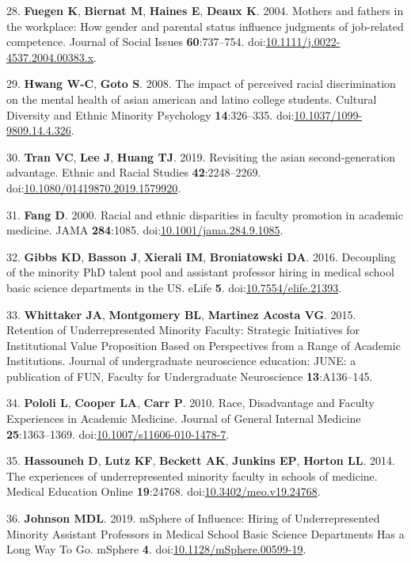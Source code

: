 \documentclass[10pt,]{article}
\begin{document}
\hypertarget{ref-Fuegen2004}{}
28. \textbf{Fuegen K}, \textbf{Biernat M}, \textbf{Haines E},
\textbf{Deaux K}. 2004. Mothers and fathers in the workplace: How gender
and parental status influence judgments of job-related competence.
Journal of Social Issues \textbf{60}:737--754.
doi:\href{https://doi.org/10.1111/j.0022-4537.2004.00383.x}{10.1111/j.0022-4537.2004.00383.x}.

\hypertarget{ref-Hwang2008}{}
29. \textbf{Hwang W-C}, \textbf{Goto S}. 2008. The impact of perceived
racial discrimination on the mental health of asian american and latino
college students. Cultural Diversity and Ethnic Minority Psychology
\textbf{14}:326--335.
doi:\href{https://doi.org/10.1037/1099-9809.14.4.326}{10.1037/1099-9809.14.4.326}.

\hypertarget{ref-Tran2019}{}
30. \textbf{Tran VC}, \textbf{Lee J}, \textbf{Huang TJ}. 2019.
Revisiting the asian second-generation advantage. Ethnic and Racial
Studies \textbf{42}:2248--2269.
doi:\href{https://doi.org/10.1080/01419870.2019.1579920}{10.1080/01419870.2019.1579920}.

\hypertarget{ref-Fang2000}{}
31. \textbf{Fang D}. 2000. Racial and ethnic disparities in faculty
promotion in academic medicine. JAMA \textbf{284}:1085.
doi:\href{https://doi.org/10.1001/jama.284.9.1085}{10.1001/jama.284.9.1085}.

\hypertarget{ref-Gibbs2016}{}
32. \textbf{Gibbs KD}, \textbf{Basson J}, \textbf{Xierali IM},
\textbf{Broniatowski DA}. 2016. Decoupling of the minority PhD talent
pool and assistant professor hiring in medical school basic science
departments in the US. eLife \textbf{5}.
doi:\href{https://doi.org/10.7554/elife.21393}{10.7554/elife.21393}.

\hypertarget{ref-whittaker_retention_2015}{}
33. \textbf{Whittaker JA}, \textbf{Montgomery BL}, \textbf{Martinez
Acosta VG}. 2015. Retention of Underrepresented Minority Faculty:
Strategic Initiatives for Institutional Value Proposition Based on
Perspectives from a Range of Academic Institutions. Journal of
undergraduate neuroscience education: JUNE: a publication of FUN,
Faculty for Undergraduate Neuroscience \textbf{13}:A136--145.

\hypertarget{ref-pololi_race_2010}{}
34. \textbf{Pololi L}, \textbf{Cooper LA}, \textbf{Carr P}. 2010. Race,
Disadvantage and Faculty Experiences in Academic Medicine. Journal of
General Internal Medicine \textbf{25}:1363--1369.
doi:\href{https://doi.org/10.1007/s11606-010-1478-7}{10.1007/s11606-010-1478-7}.

\hypertarget{ref-hassouneh_experiences_2014}{}
35. \textbf{Hassouneh D}, \textbf{Lutz KF}, \textbf{Beckett AK},
\textbf{Junkins EP}, \textbf{Horton LL}. 2014. The experiences of
underrepresented minority faculty in schools of medicine. Medical
Education Online \textbf{19}:24768.
doi:\href{https://doi.org/10.3402/meo.v19.24768}{10.3402/meo.v19.24768}.

\hypertarget{ref-johnson_msphere_2019}{}
36. \textbf{Johnson MDL}. 2019. mSphere of Influence: Hiring of
Underrepresented Minority Assistant Professors in Medical School Basic
Science Departments Has a Long Way To Go. mSphere \textbf{4}.
doi:\href{https://doi.org/10.1128/mSphere.00599-19}{10.1128/mSphere.00599-19}.
\end{document}
